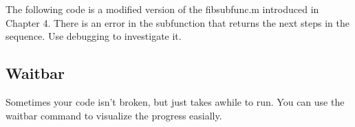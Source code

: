 The following code is a modified version of the fibsubfunc.m introduced in Chapter 4.
 There is an error in the subfunction that returns the next steps in the sequence.
 Use debugging to investigate it.

\begin{quote}
 
\end{quote}

\pagebreak
\subsection{Waitbar}
Sometimes your code isn't broken, but just takes awhile to run.
 You can use the waitbar command to visualize the progress easially.

\begin{quote}
 
\end{quote}
